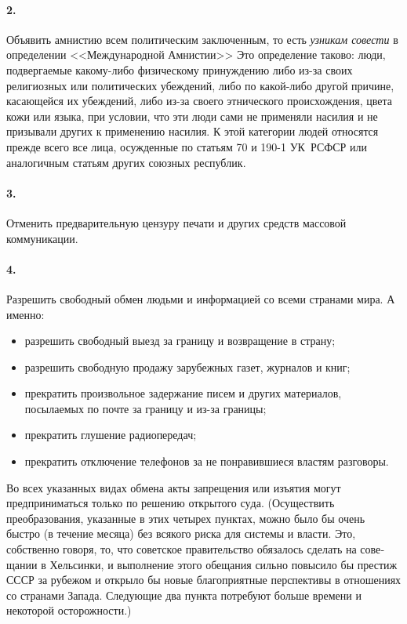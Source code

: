 \documentclass{book}
\begin{document}
\paragraph{2.} Объявить амнистию всем политическим заключенным, то есть \textit{узникам совести}  в определении <<Международной Амнистии>> Это определение таково: люди, подвергаемые какому-либо физическому принуждению либо из-за своих религиоз­ных или политических убеждений, либо по какой-либо другой причине, касающейся их убеждений, либо из-за своего этниче­ского происхождения, цвета кожи или языка, при условии, что эти люди сами не применяли насилия и не призывали дру­гих к применению насилия. К этой категории людей относят­ся прежде всего все лица, осужденные по статьям 70 и 190-1 УК~РСФСР или аналогичным статьям других союзных респуб­лик.

\paragraph{3.} Отменить предварительную цензуру печати и других средств массовой коммуникации.

\paragraph{4.} Разрешить свободный обмен людьми и информацией со всеми странами мира. А именно:
\begin{itemize}
 \item разрешить свободный выезд за границу и возвращение в страну;
 \item разрешить свободную продажу зарубежных газет, журна­лов и книг;
 \item прекратить произвольное задержание писем и других ма­териалов, посылаемых по почте за границу и из-за границы;
 \item прекратить глушение радиопередач;
 \item прекратить отключение телефонов за не понравившиеся властям разговоры.
\end{itemize}

Во всех указанных видах обмена акты запрещения или изъя­тия могут предприниматься только по решению открытого су­да.
(Осуществить преобразования, указанные в этих четырех пунктах, можно было бы очень быстро (в течение месяца) без всякого риска для системы и власти. Это, собственно гово­ря, то, что советское правительство обязалось сделать на сове­щании в Хельсинки, и выполнение этого обещания сильно повы­сило бы престиж СССР за рубежом и открыло бы новые благо­приятные перспективы в отношениях со странами Запада. Сле­дующие два пункта потребуют больше времени и некоторой осторожности.)
\end{document}
